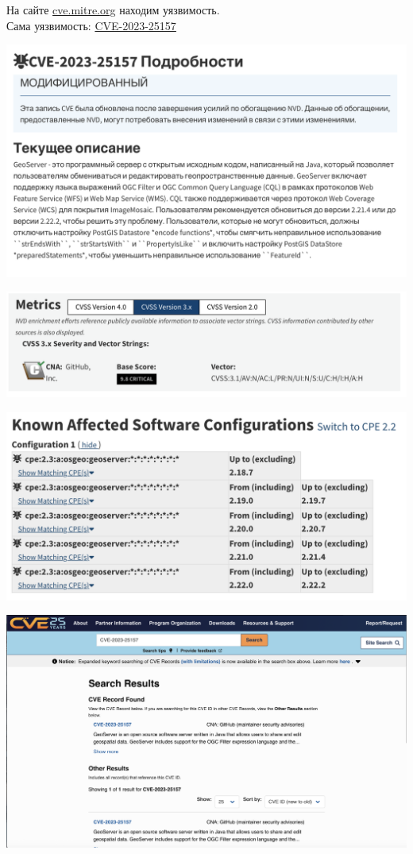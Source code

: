 \documentclass{article}
\begin{document}
На сайте \href{https://cve.mitre.org/}{cve.mitre.org} находим уязвимость.
\\
Сама уязвимость: \href{https://www.cve.org/CVERecord/SearchResults?query=CVE-2023-25157}{CVE-2023-25157}
\begin{center}
  \includegraphics[width=.7\textwidth]{nvd1}
\end{center}
\begin{center}
  \includegraphics[width=.7\textwidth]{nvd2.png}
\end{center}
\begin{center}
  \includegraphics[width=.7\textwidth]{nvd3}
\end{center}
\begin{center}
  \includegraphics[width=.9\textwidth]{cve.png}
\end{center}
\end{document}
